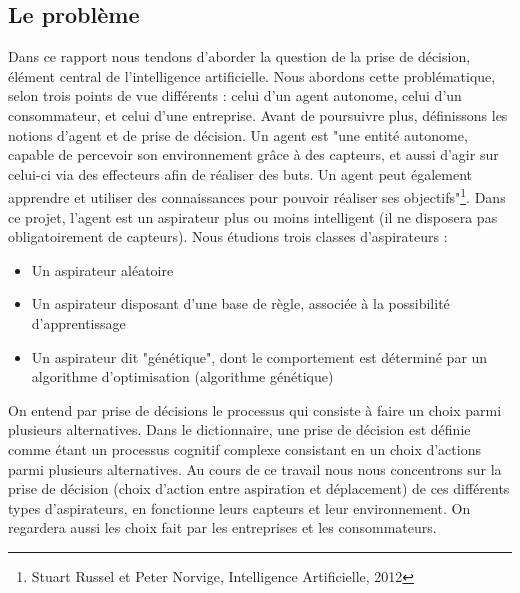 \documentclass[12pt]{article}
\begin{document}
\subsection{Le problème}
\justify
Dans ce rapport nous tendons d'aborder la question de la prise de décision, élément central de l'intelligence artificielle. Nous abordons cette problématique, selon trois points de vue différents : celui d'un agent autonome, celui d'un consommateur, et celui d'une entreprise. 
\justify
Avant de poursuivre plus, définissons les notions d'agent et de prise de décision.
\justify
Un agent est "une entité autonome, capable de percevoir son environnement grâce à des capteurs, et aussi d'agir sur celui-ci via des effecteurs afin de réaliser des buts. Un agent peut également apprendre et utiliser des connaissances pour pouvoir réaliser ses objectifs"\footnote{Stuart Russel et Peter Norvige, Intelligence Artificielle, 2012}.
\justify
Dans ce projet, l'agent est un aspirateur plus ou moins intelligent (il ne disposera pas obligatoirement de capteurs). Nous étudions trois classes d'aspirateurs : 
\begin{itemize}
\item Un aspirateur aléatoire
\item Un aspirateur disposant d'une base de règle, associée à la possibilité d'apprentissage
\item Un aspirateur dit "génétique", dont le comportement est déterminé par un algorithme d'optimisation (algorithme génétique)
\end{itemize}
On entend par prise de décisions le processus qui consiste à faire un choix parmi plusieurs alternatives.
Dans le dictionnaire, une prise de décision est définie comme étant un processus cognitif complexe consistant en un choix d'actions parmi plusieurs alternatives. 
\justify
Au cours de ce travail nous nous concentrons sur la prise de décision (choix d'action entre aspiration et déplacement) de ces différents types d'aspirateurs, en fonctionne leurs capteurs et leur environnement. On regardera aussi les choix fait par les entreprises et les consommateurs. 
\end{document}
